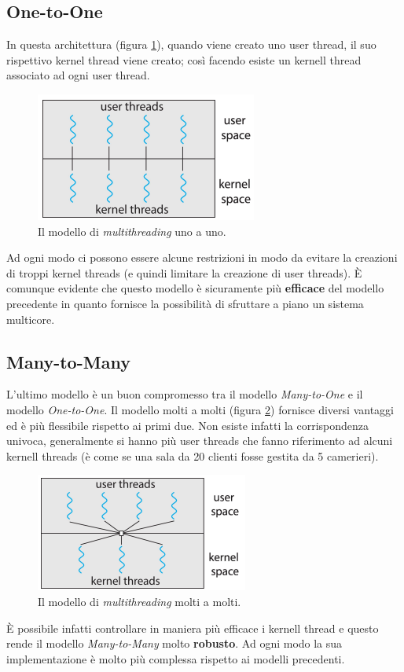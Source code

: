 \subsection{One-to-One}
In questa architettura (figura \ref{fig:one_to_one}), quando viene creato uno user thread, il suo rispettivo kernel thread viene creato; così facendo esiste un kernell thread associato ad ogni user thread. 
\begin{figure}[!h]
    \centering
    \includegraphics[width = .5\textwidth]{../res/imgs/threads/one_to_one.png}
    \caption{Il modello di \textit{multithreading} uno a uno.}
    \label{fig:one_to_one}
\end{figure}
Ad ogni modo ci possono essere alcune restrizioni in modo da evitare la creazioni di troppi kernel threads (e quindi limitare la creazione di user threads). È comunque evidente che questo modello è sicuramente più \textbf{efficace} del modello precedente in quanto fornisce la possibilità di sfruttare a piano un sistema multicore.
% 
\subsection{Many-to-Many}
L'ultimo modello è un buon compromesso tra il modello \textit{Many-to-One} e il modello \textit{One-to-One}. Il modello molti a molti (figura \ref{fig:many_to_many}) fornisce diversi vantaggi ed è più flessibile rispetto ai primi due. Non esiste infatti la corrispondenza univoca, generalmente si hanno più user threads che fanno riferimento ad alcuni kernell threads (è come se una sala da 20 clienti fosse gestita da 5 camerieri). 
\begin{figure}[!h]
    \centering
    \includegraphics[width = .5\textwidth]{../res/imgs/threads/many_to_many.png}
    \caption{Il modello di \textit{multithreading} molti a molti.}
    \label{fig:many_to_many}
\end{figure}
È possibile infatti controllare in maniera più efficace i kernell thread e questo rende il modello \textit{Many-to-Many} molto \textbf{robusto}. Ad ogni modo la sua implementazione è molto più complessa rispetto ai modelli precedenti.

